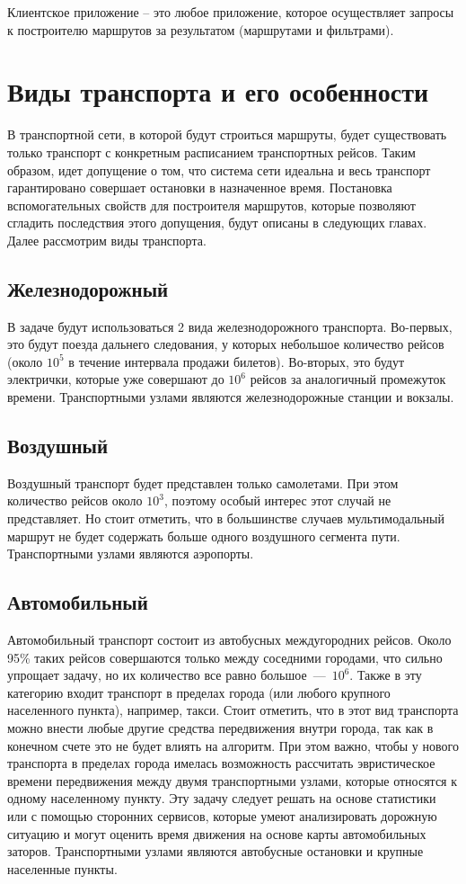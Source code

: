 \begin{definition}
Клиентское приложение -- это любое приложение, которое осуществляет запросы к построителю маршрутов за результатом (маршрутами и фильтрами).
\end{definition}

\section{Виды транспорта и его особенности}
В транспортной сети, в которой будут строиться маршруты, будет существовать только транспорт с конкретным расписанием транспортных рейсов. Таким образом, идет допущение о том, что система сети идеальна и весь транспорт гарантировано совершает остановки в назначенное время. Постановка вспомогательных свойств для построителя маршрутов, которые позволяют сгладить последствия этого допущения, будут описаны в следующих главах. Далее рассмотрим виды транспорта.

\subsection{Железнодорожный}
В задаче будут использоваться 2 вида железнодорожного транспорта. Во-первых, это будут поезда дальнего следования, у которых небольшое количество рейсов (около $10^5$ в течение интервала продажи билетов). Во-вторых, это будут электрички, которые уже совершают до $10^6$ рейсов за аналогичный промежуток времени.
Транспортными узлами являются железнодорожные станции и вокзалы.

\subsection{Воздушный}
Воздушный транспорт будет представлен только самолетами. При этом количество рейсов около $10^3$, поэтому особый интерес этот случай не представляет. Но стоит отметить, что в большинстве случаев мультимодальный маршрут не будет содержать больше одного воздушного сегмента пути.
Транспортными узлами являются аэропорты.

\subsection{Автомобильный}
Автомобильный транспорт состоит из автобусных междугородних рейсов. Около 95\% таких рейсов совершаются только между соседними городами, что сильно упрощает задачу, но их количество все равно большое~—~$10^6$.
Также в эту категорию входит транспорт в пределах города (или любого крупного населенного пункта), например, такси. Стоит отметить, что в этот вид транспорта можно внести любые другие средства передвижения внутри города, так как в конечном счете это не будет влиять на алгоритм. При этом важно, чтобы у нового транспорта в пределах города имелась возможность рассчитать эвристическое времени передвижения между двумя транспортными узлами, которые относятся к одному населенному пункту. Эту задачу следует решать на основе статистики или с помощью сторонних сервисов, которые умеют анализировать дорожную ситуацию и могут оценить время движения на основе карты автомобильных заторов.
Транспортными узлами являются автобусные остановки и крупные населенные пункты.

